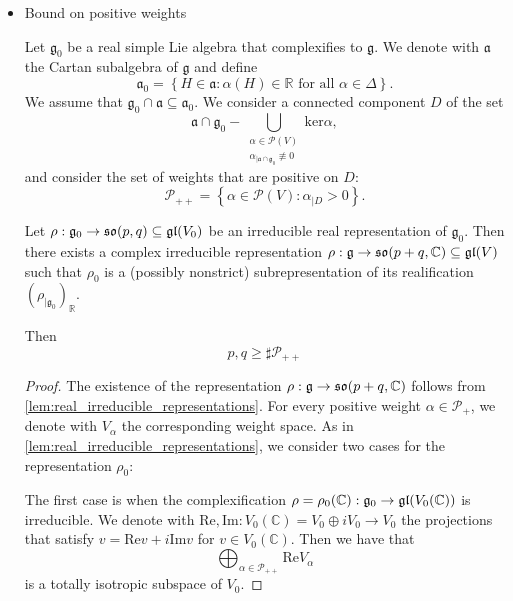 \documentclass{report}
\begin{document}
\begin{itemize}
\begin{proof}
        Assuming now that $\rho_0$ preserves a form $\omega$, we can consider $\omega$ as a complex form on $V_0(\mathbb C)$, and we have that the complexification $\rho_0(\mathbb C)$ preserves this complex form.
        In particular, $\rho$ will also preserve it, since it is a subrepresentation of $\rho_0(\mathbb C)$.
    \end{proof}
    \item Bound on positive weights
    \begin{lemma}\label{lem:bound_positive_weights}
        Let $\mathfrak g_0$ be a real simple Lie algebra that complexifies to $\mathfrak g$.
        We denote with $\mathfrak a$ the Cartan subalgebra of $\mathfrak g$ and define 
        \[
        \mathfrak a_0 = \left\{ H \in \mathfrak a: \alpha(H) \in \mathbb R \text{ for all } \alpha \in \Delta \right\}.
        \]
        We assume that $\mathfrak g_0 \cap \mathfrak a \subseteq \mathfrak a_0$.
        We consider a connected component $D$ of the set
        \[
        \mathfrak a \cap \mathfrak g_0 - \bigcup_{\substack{\alpha \in \mathcal P(V)\\ \alpha_{|\mathfrak a \cap \mathfrak g_0} \not \equiv 0}} \mathrm{ker} \alpha,
        \]
        and consider the set of weights that are positive on $D$:
        \[
        \mathcal P_{++} = \left\{ \alpha \in \mathcal P(V) : \alpha_{|D} > 0 \right\}.
        \]

        Let $\rho: \mathfrak g_0 \to \operatorname{{\mathfrak{so}}}(p,q) \subseteq \mathfrak{gl}(V_0)$ be an irreducible real representation of $\mathfrak g_0$.
        Then there exists a complex irreducible representation $\rho: \mathfrak g \to \operatorname{{\mathfrak{so}}}(p+q, \mathbb C) \subseteq \operatorname{{\mathfrak{gl}}}(V)$ such that $\rho_0$ is a (possibly nonstrict) subrepresentation of its realification $\left(\rho_{|\mathfrak g_0}\right)_\mathbb R$.
        
        Then
        \[
        p,q \geq \sharp \mathcal P_{++}
        \]
    \end{lemma}
    \begin{proof}
        The existence of the representation $\rho: \mathfrak g \to \operatorname{{\mathfrak{so}}}(p+q, \mathbb C)$ follows from \cref{lem:real_irreducible_representations}.
        For every positive weight $\alpha \in \mathcal P_+$, we denote with $V_\alpha$ the corresponding weight space.
        As in \cref{lem:real_irreducible_representations}, we consider two cases for the representation $\rho_0$:
        
        The first case is when the complexification $\rho = \rho_0(\mathbb C): \mathfrak g_0 \to \operatorname{{\mathfrak{gl}}}(V_0(\mathbb C))$ is irreducible.
        We denote with $\mathrm{Re}, \mathrm{Im} : V_0(\mathbb C) = V_0 \oplus i V_0 \to V_0$ the projections that satisfy $v = \mathrm{Re}v + i \mathrm{Im}v$ for $v \in V_0(\mathbb C)$.
        Then we have that 
        \[
        \bigoplus_{\alpha \in \mathcal P_{++}} \mathrm{Re}V_\alpha
        \]
        is a totally isotropic subspace of $V_0$.
        

\end{proof}
\end{itemize}
\end{document}

